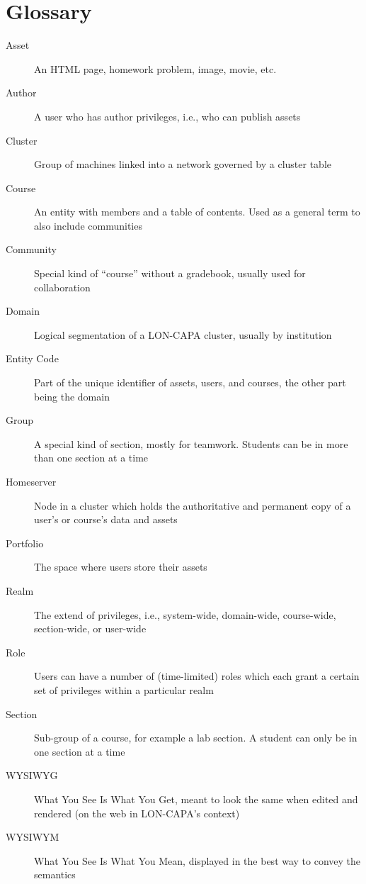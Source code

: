 \chapter{Glossary}
\begin{description}
\item[Asset] An HTML page, homework problem, image, movie, etc.
\item[Author] A user who has author privileges, i.e., who can publish assets
\item[Cluster] Group of machines linked into a network governed by a cluster table
\item[Course] An entity with members and a table of contents. Used as a general term to also include communities
\item[Community] Special kind of ``course'' without a gradebook, usually used for collaboration
\item[Domain] Logical segmentation of a LON-CAPA cluster, usually by institution
\item[Entity Code] Part of the unique identifier of assets, users, and courses, the other part being the domain
\item[Group] A special kind of section, mostly for teamwork. Students can be in more than one section at a time
\item[Homeserver] Node in a cluster which holds the authoritative and permanent copy of a user's or course's data and assets
\item[Portfolio] The space where users store their assets
\item[Realm] The extend of privileges, i.e., system-wide, domain-wide, course-wide, section-wide, or user-wide
\item[Role] Users can have a number of (time-limited) roles which each grant a certain set of privileges within a particular realm
\item[Section] Sub-group of a course, for example a lab section. A student can only be in one section at a time
\item[WYSIWYG] What You See Is What You Get, meant to look the same when edited and rendered (on the web in LON-CAPA's context)
\item[WYSIWYM] What You See Is What You Mean, displayed in the best way to convey the semantics
\end{description} 
